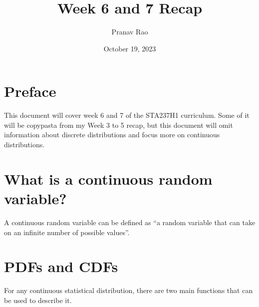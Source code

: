 \documentclass[12pt]{article}
\title{Week 6 and 7 Recap}
\author{Pranav Rao}
\date{October 19, 2023}
\begin{document}
\maketitle

\section{Preface}

This document will cover week 6 and 7 of the STA237H1 curriculum. Some of it
will be copypasta from my Week 3 to 5 recap, but this document will omit
information about discrete distributions and focus more on continuous
distributions.

\section{What is a continuous random variable?}

A continuous random variable can be defined as ``a random variable that can
take on an infinite number of possible values''.

\section{PDFs and CDFs}

For any continuous statistical distribution, there are two main functions that can be used
to describe it.
\end{document}

